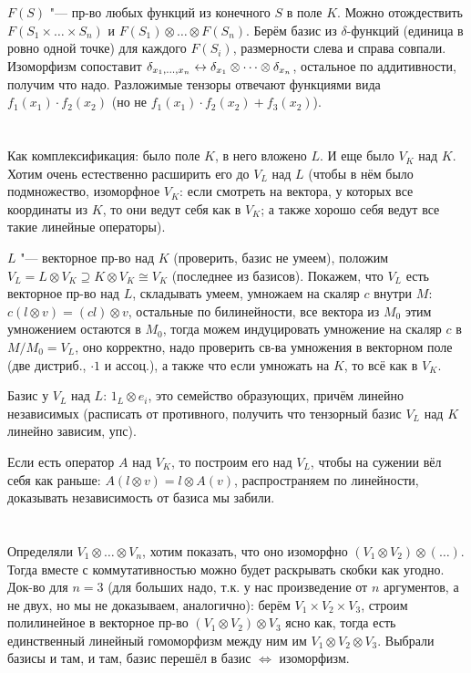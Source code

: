 \section{} %
$F(S)$ "--- пр-во любых функций из конечного $S$ в поле $K$.
Можно отождествить $F(S_1 \times \dots \times S_n)$ и $F(S_1) \otimes \dots \otimes F(S_n)$.
Берём базис из $\delta$-функций (единица в ровно одной точке) для каждого $F(S_i)$, размерности слева и справа совпали.
Изоморфизм сопоставит $\delta_{x_1, \dots, x_n} \leftrightarrow \delta_{x_1} \otimes \dots \otimes \delta_{x_n}$,
остальное по аддитивности, получим что надо.
Разложимые тензоры отвечают функциями вида $f_1(x_1) \cdot f_2(x_2)$ (но не $f_1(x_1)\cdot f_2(x_2) + f_3(x_2)$).

\section{} %
Как комплексификация: было поле $K$, в него вложено $L$.
И еще было $V_K$ над $K$.
Хотим очень естественно расширить его до $V_L$ над $L$
(чтобы в нём было подмножество, изоморфное $V_K$: если смотреть на
вектора, у которых все координаты из $K$, то они ведут себя как в $V_K$;
а также хорошо себя ведут все такие линейные операторы).

$L$ "--- векторное пр-во над $K$ (проверить, базис не умеем), положим $V_L=L \otimes V_K \supseteq K \otimes V_K \cong V_K$ (последнее из базисов).
Покажем, что $V_L$ есть векторное пр-во над $L$, складывать умеем, умножаем на скаляр $c$ внутри $M$: $c(l\otimes v)=(cl)\otimes v$, остальные по билинейности,
все вектора из $M_0$ этим умножением остаются в $M_0$, тогда можем индуцировать умножение на скаляр $c$ в $M/M_0=V_L$, оно корректно, надо
проверить св-ва умножения в векторном поле (две дистриб., $\cdot 1$ и ассоц.), а также что если умножать на $K$, то всё как в $V_K$.

Базис у $V_L$ над $L$: $1_L \otimes e_i$, это семейство образующих, причём линейно независимых (расписать от противного,
получить что тензорный базис $V_L$ над $K$ линейно зависим, упс).

Если есть оператор $A$ над $V_K$, то построим его над $V_L$, чтобы на сужении вёл себя как раньше:
$A(l \otimes v) = l \otimes A(v)$, распространяем по линейности, доказывать независимость от базиса мы забили.

\section{} %
Определяли $V_1 \otimes \dots \otimes V_n$,
хотим показать, что оно изоморфно $(V_1 \otimes V_2) \otimes (\dots)$.
Тогда вместе с коммутативностью можно будет раскрывать скобки как угодно.
Док-во для $n=3$ (для больших надо, т.к. у нас произведение от $n$ аргументов, а не двух,
но мы не доказываем, аналогично): берём $V_1 \times V_2 \times V_3$, строим полилинейное в
векторное пр-во $(V_1 \otimes V_2) \otimes V_3$ ясно как, тогда есть единственный линейный гомоморфизм
между ним им $V_1 \otimes V_2 \otimes V_3$.
Выбрали базисы и там, и там, базис перешёл в базис $\iff$ изоморфизм.

